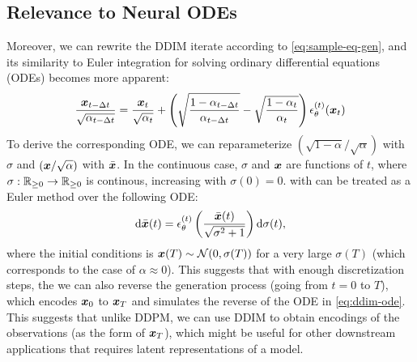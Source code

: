 \subsection{Relevance to Neural ODEs}
Moreover, we can rewrite the DDIM iterate according to \eqref{eq:sample-eq-gen}, and its similarity to Euler integration for solving ordinary differential equations (ODEs) becomes more apparent:
\begin{align}
    \frac{{\bm{x}}_{t-\Delta t}}{\sqrt{\alpha_{t-\Delta t}}}  = \frac{{\bm{x}}_t}{\sqrt{\alpha_t}}  + \left(\sqrt{\frac{1 - \alpha_{t-\Delta t}}{\alpha_{t-\Delta t}}} - \sqrt{\frac{1 - \alpha_{t}}{\alpha_t}}\right) \epsilon_\theta^{(t)}({\bm{x}}_t) \label{eq:ddim-euler}
\end{align}
To derive the corresponding ODE, we can reparameterize $(\sqrt{1 - \alpha} / \sqrt{\alpha})$ with $\sigma$ and $({\bm{x}} / \sqrt{\alpha})$ with $\bar{{\bm{x}}}$. In the continuous case, $\sigma$ and ${\bm{x}}$ are functions of $t$, where $\sigma: {\mathbb{R}}_{\geq 0} \to {\mathbb{R}}_{\geq 0}$ is continous, increasing with $\sigma(0) = 0$.
 with can be treated as a Euler method over the following ODE:
\begin{align}
   \mathrm{d} \bar{{\bm{x}}}(t) = \epsilon_\theta^{(t)}\left(\frac{\bar{{\bm{x}}}(t)}{\sqrt{\sigma^2 + 1}}\right) \mathrm{d} \sigma(t) \label{eq:ddim-ode},
\end{align}
where the initial conditions is ${\bm{x}}(T) \sim {\mathcal{N}}(0, \sigma(T))$ for a very large $\sigma(T)$ (which corresponds to the case of $\alpha \approx 0$). This suggests that with enough discretization steps, the we can also reverse the generation process (going from $t = 0$ to $T$), which encodes ${\bm{x}}_0$ to ${\bm{x}}_T$ and simulates the reverse of the ODE in \eqref{eq:ddim-ode}. This suggests that unlike DDPM, we can use DDIM to obtain encodings of the observations (as the form of ${\bm{x}}_T$), which might be useful for other downstream applications that requires latent representations of a model.

